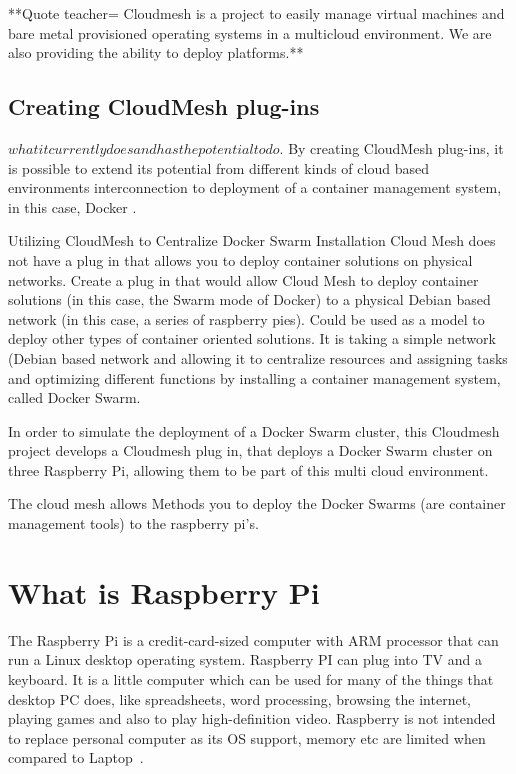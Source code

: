 	**Quote teacher=
	Cloudmesh is a project to easily manage virtual machines and bare metal
  provisioned operating systems in a multicloud environment. 
  We are also providing the ability to deploy platforms.**
	
	\subsection{Creating CloudMesh plug-ins}
	$what it currently does and has the potential to do$.  
	By creating CloudMesh plug-ins, it is possible to  extend its 
  potential from different kinds of cloud based environments
  interconnection to deployment of a container management 
  system, in this case, Docker .  
	
Utilizing CloudMesh to Centralize Docker Swarm Installation 
Cloud Mesh does not have a plug in that allows you to deploy 
container solutions on physical networks.  Create a plug in 
that would allow Cloud Mesh to deploy container solutions
(in this case, the Swarm mode of Docker) to a physical Debian 
based network (in this case, a series of raspberry pies).  
Could be used as a model to deploy other types of container
oriented solutions.  It is taking a simple network (Debian 
based network and allowing it to centralize resources and
assigning tasks and optimizing different functions by 
installing a container management system, called Docker Swarm.
	
In order to simulate the deployment of a Docker Swarm cluster, 
this Cloudmesh project develops a Cloudmesh plug in, that deploys
a Docker Swarm cluster on three Raspberry Pi, allowing them to be
part of this multi cloud environment.
	
The cloud mesh allows Methods you to deploy the Docker Swarms 
(are container management tools) to the raspberry pi's.
	
\section{What is Raspberry Pi}
The Raspberry Pi is a credit-card-sized computer with ARM 
processor that can run a Linux desktop operating system.
Raspberry PI can plug into TV and a keyboard. It is a
little computer which can be used for many of the things 
that desktop PC does, like spreadsheets, word processing,
browsing the internet, playing games and also to play 
high-definition video. Raspberry is not intended to 
replace personal computer as its OS support, memory etc
are limited when compared to Laptop~\cite{Rpi}.
	
